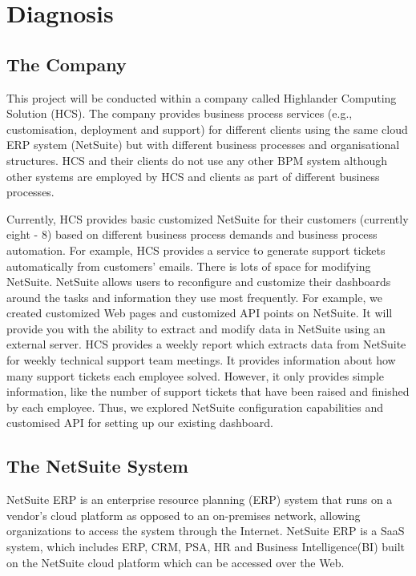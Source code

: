 \chapter{Diagnosis}
\label{chap:diagnosis}

\section{The Company}
\label{sec:diagnosis-company}

This project will be conducted within a company called Highlander Computing Solution (HCS). The company provides business process services (e.g., customisation, deployment and support) for different clients using the same cloud ERP system (NetSuite) but with different business processes and organisational structures. HCS and their clients do not use any other BPM system although other systems are employed by HCS and clients as part of different business processes.\par

Currently, HCS provides basic customized NetSuite for their customers (currently eight - 8) based on different business process demands and business process automation. For example, HCS provides a service to generate support tickets automatically from customers’ emails. There is lots of space for modifying NetSuite. NetSuite allows users to reconfigure and customize their dashboards around the tasks and information they use most frequently. For example, we created customized Web pages and customized API points on NetSuite. It will provide you with the ability to extract and modify data in NetSuite using an external server. HCS provides a weekly report which extracts data from NetSuite for weekly technical support team meetings. It provides information about how many support tickets each employee solved. However, it only provides simple information, like the number of support tickets that have been raised and finished by each employee. Thus, we explored NetSuite configuration capabilities and customised API  for setting up our existing dashboard. \par

\section{The NetSuite System}

NetSuite ERP is an enterprise resource planning (ERP) system that runs on a vendor’s cloud platform as opposed to an on-premises network, allowing organizations to access the system through the Internet. NetSuite ERP is a SaaS system, which includes ERP, CRM, PSA, HR and Business Intelligence(BI) built on the NetSuite cloud platform which can be accessed over the Web. \par


